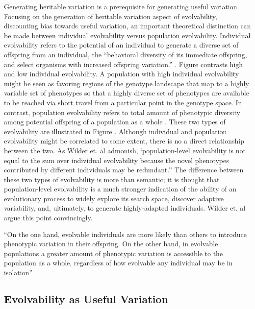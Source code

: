 Generating heritable variation is a prerequisite for generating useful variation.\mindmapmark{\evolvabilityheritablevariation} Focusing on the generation of heritable variation aspect of evolvability, discounting bias towards useful variation, an important theoretical distinction can be made between individual evolvability versus population evolvability. Individual evolvability refers to the potential of an individual to generate a diverse set of offspring from an individual, the ``behavioral diversity of its immediate  offspring,  and  select  organisms  with  increased offspring variation.'' \cite{Mengistu2016EvolvabilityIt}. Figure  contrasts high and low individual evolvability. A population with high individual evolvability might be seen as favoring regions of the genotype landscape that map to a highly variable set of phenotypes so that a highly diverse set of phenotypes are available to be reached via short travel from a particular point in the genotype space. In contrast, population evolvability refers to total amount of phenotypic diversity among potential offspring of a population as a whole \cite{Wilder2015ReconcilingEvolvability}. These two types of evolvability are illustrated in Figure . Although individual and population evolvability might be correlated to some extent, there is no a direct relationship between the two. As Wilder et. al admonish, `population-level evolvability is not equal to the sum over individual evolvability because the novel phenotypes contributed by different individuals may be redundant.'' \cite{Wilder2015ReconcilingEvolvability} The difference between these two types of evolvability is more than semantic; it is thought that population-level evolvability is a much stronger indication of the ability of an evolutionary process to widely explore its search space, discover adaptive variability, and, ultimately, to generate highly-adapted individuals. Wilder et. al argue this point convincingly.
\begin{displayquote}
``On the one hand, evolvable individuals are more likely than others to introduce phenotypic variation in their offspring. On the other hand, in evolvable populations a greater amount of phenotypic variation is accessible to the population as a whole, regardless of how evolvable any individual may be in isolation'' \cite{Wilder2015ReconcilingEvolvability}
\end{displayquote}

\subsection{Evolvability as Useful Variation}

